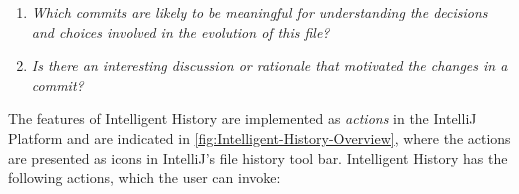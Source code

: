 \begin{enumerate}[label={(\arabic*)}]
    \item \textit{Which commits are likely to be meaningful for understanding the decisions and choices involved in the evolution of this file?}
    \item \textit{Is there an interesting discussion or rationale that motivated the changes in a commit?}
\end{enumerate}

The features of Intelligent History are implemented as \emph{actions} in the IntelliJ Platform  and are indicated in \autoref{fig:Intelligent-History-Overview}, where the actions are presented as icons in IntelliJ's  file history tool bar.
Intelligent History has the following actions, which the user can invoke:

